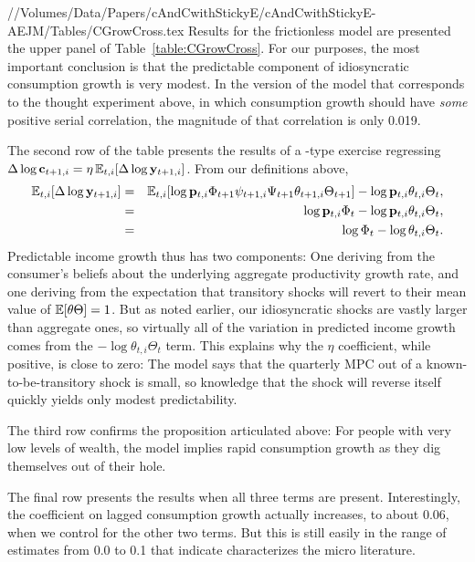 \documentclass[titlepage]{./econtex}
\begin{document}
//Volumes/Data/Papers/cAndCwithStickyE/cAndCwithStickyE-AEJM/Tables/CGrowCross.tex
Results for the frictionless model are presented the upper panel of Table~\ref{table:CGrowCross}.
For our purposes, the most important conclusion is that the predictable component of idiosyncratic consumption growth is very modest.  In the version of the model that corresponds to the thought experiment above, in which consumption growth should have {\it some} positive serial correlation, the magnitude of that correlation is only 0.019. 

The second row of the table presents the results of a \cite{cmModel}-type exercise regressing $\Delta \log \mathbf{c}_{t+1,i} = \eta \operatorname{\mathbb{E}}_{t,i}[\Delta \log \mathbf{y}_{t+1,i}]$.  From our definitions above,
\begin{eqnarray*}
  \operatorname{\mathbb{E}}_{t,i}[\Delta \log \mathbf{y}_{t+1,i}] & = & \operatorname{\mathbb{E}}_{t,i}[\log \mathbf{p}_{t,i}\Phi_{t+1}\psi_{t+1,i}\Psi_{t+1}\theta_{t+1,i}\Theta_{t+1}] - \log \mathbf{p}_{t,i}\theta_{t,i}\Theta_{t},
  \\ & = & \log \mathbf{p}_{t,i}\Phi_{t} - \log \mathbf{p}_{t,i}\theta_{t,i}\Theta_{t},
   \\ & = & \log \Phi_{t} - \log \theta_{t,i}\Theta_{t}.
\end{eqnarray*}
Predictable income growth thus has two components: One deriving from the consumer's beliefs about the underlying aggregate productivity growth rate, and one deriving from the expectation that transitory shocks will revert to their mean value of $\operatorname{\mathbb{E}}[\theta \Theta]=1$.  But as noted earlier, our idiosyncratic shocks are vastly larger than aggregate ones, so virtually all of the variation in predicted income growth comes from the $-\log \theta_{t,i}\Theta_{t}$ term.  This explains why the $\eta$ coefficient, while positive, is close to zero: The model says that the quarterly MPC out of a known-to-be-transitory shock is small, so knowledge that the shock will reverse itself quickly yields only modest predictability.

The third row confirms the proposition articulated above: For people with very low levels of wealth, the model implies rapid consumption growth as they dig themselves out of their hole.

The final row presents the results when all three terms are present.  Interestingly, the coefficient on lagged consumption growth actually increases, to about 0.06, when we control for the other two terms.  But this is still easily in the range of estimates from 0.0 to 0.1 that \cite{hrsHabit} indicate characterizes the micro literature.
\end{document}
